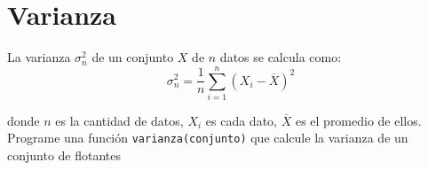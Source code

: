 \section{Varianza}
La varianza $\sigma_{n}^{2}$ de un conjunto $X$ de $n$ datos se calcula como:
\begin{displaymath}
    \sigma_{n}^{2} = \frac{1}{n} \sum \limits_{i=1}^{n} (X_{i} - \overline{X})^{2}
\end{displaymath}

donde $n$ es la cantidad de datos, $X_{i}$ es cada dato, $\overline{X}$ es el promedio de ellos.\\

Programe una función \texttt{varianza(conjunto)} que calcule la varianza de un conjunto de flotantes
